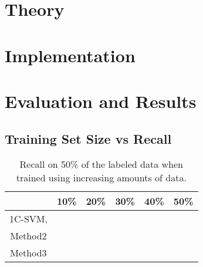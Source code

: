 \documentclass[12pt,letterpaper]{report}
\begin{document}
\chapter {Theory}



\chapter{Implementation}




\chapter{Evaluation and Results}






\section{Training Set Size vs Recall}
 
\begin{table}
  \centering
  \caption{Recall on 50\% of the labeled data when trained using increasing amounts of data.}
  \label{table:recall-vs-training-set-size}
  \begin{tabular}{cccccc} 
                                 & 10\% & 20\% & 30\% & 40\% & 50\% \\ 
      \hline 
      1C-SVM, \cite{chen2001one}  &      &      &      &      &      \\ 
      Method2                    &      &      &      &      &      \\ 
      Method3                    &      &      &      &      &      \\ 
      \hline 
  \end{tabular}
\end{table}
\end{document}
